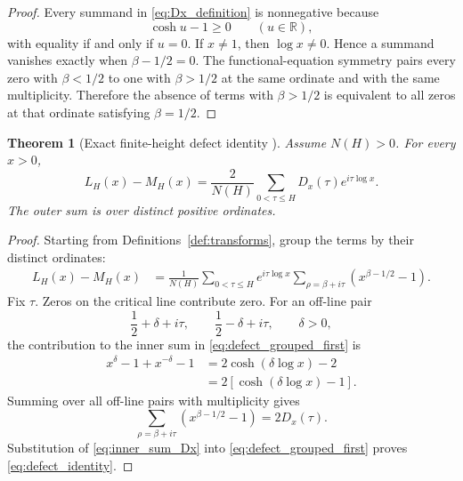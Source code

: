 \documentclass[11pt]{amsart}
\numberwithin{equation}{section}
\theoremstyle{plain}
\newtheorem{theorem}{Theorem}[section]
\theoremstyle{definition}
\theoremstyle{remark}
\begin{document}
\begin{proof}
Every summand in \eqref{eq:Dx_definition} is nonnegative because
\begin{equation}
\cosh u-1\geq0
\qquad(u\in\mathbb R),
\label{eq:cosh_positivity}
\end{equation}
with equality if and only if $u=0$.  If $x\neq1$, then $\log x\neq0$.  Hence a summand vanishes exactly when $\beta-1/2=0$.  The functional-equation symmetry pairs every zero with $\beta<1/2$ to one with $\beta>1/2$ at the same ordinate and with the same multiplicity.  Therefore the absence of terms with $\beta>1/2$ is equivalent to all zeros at that ordinate satisfying $\beta=1/2$.
\end{proof}

\begin{theorem}[Exact finite-height defect identity {}]
\label{thm:defect_identity}
Assume $N(H)>0$.
For every $x>0$,
\begin{equation}
\boxed{
L_H(x)-M_H(x)
=
\frac{2}{N(H)}
\sum_{0<\tau\leq H}
D_x(\tau)e^{i\tau\log x}.
}
\label{eq:defect_identity}
\end{equation}
The outer sum is over distinct positive ordinates.
\end{theorem}

\begin{proof}
Starting from Definitions~\ref{def:transforms}, group the terms by their distinct ordinates:
\begin{align}
L_H(x)-M_H(x)
&=
\frac{1}{N(H)}
\sum_{0<\tau\leq H}
 e^{i\tau\log x}
\sum_{\rho=\beta+i\tau}
\left(x^{\beta-1/2}-1\right).
\label{eq:defect_grouped_first}
\end{align}
Fix $\tau$.  Zeros on the critical line contribute zero.  For an off-line pair
\begin{equation}
\frac12+\delta+i\tau,
\qquad
\frac12-\delta+i\tau,
\qquad
\delta>0,
\label{eq:off_line_pair}
\end{equation}
the contribution to the inner sum in \eqref{eq:defect_grouped_first} is
\begin{align}
x^\delta-1+x^{-\delta}-1
&=
2\cosh(\delta\log x)-2
\label{eq:pair_contribution_first}
\\
&=
2\left[\cosh(\delta\log x)-1\right].
\label{eq:pair_contribution_second}
\end{align}
Summing over all off-line pairs with multiplicity gives
\begin{equation}
\sum_{\rho=\beta+i\tau}
\left(x^{\beta-1/2}-1\right)
=2D_x(\tau).
\label{eq:inner_sum_Dx}
\end{equation}
Substitution of \eqref{eq:inner_sum_Dx} into \eqref{eq:defect_grouped_first} proves \eqref{eq:defect_identity}.
\end{proof}
\end{document}
